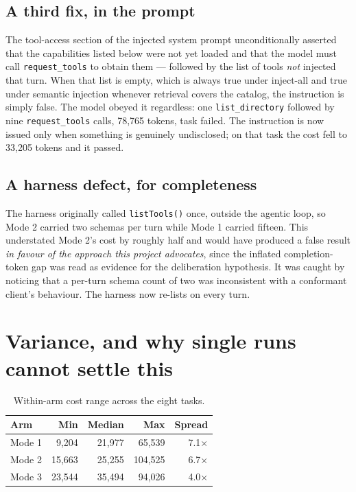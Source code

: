 \documentclass[11pt,a4paper]{article}
\begin{document}
\subsection{A third fix, in the prompt}

The tool-access section of the injected system prompt unconditionally asserted that the capabilities
listed below were not yet loaded and that the model must call \texttt{request\_tools} to obtain them
--- followed by the list of tools \emph{not} injected that turn. When that list is empty, which is
always true under inject-all and true under semantic injection whenever retrieval covers the
catalog, the instruction is simply false. The model obeyed it regardless: one \texttt{list\_directory}
followed by nine \texttt{request\_tools} calls, 78{,}765 tokens, task failed. The instruction is now
issued only when something is genuinely undisclosed; on that task the cost fell to 33{,}205 tokens
and it passed.

\subsection{A harness defect, for completeness}
\label{sec:harnessbug}

The harness originally called \texttt{listTools()} once, outside the agentic loop, so Mode 2 carried
two schemas per turn while Mode 1 carried fifteen. This understated Mode 2's cost by roughly half and
would have produced a false result \emph{in favour of the approach this project advocates}, since the
inflated completion-token gap was read as evidence for the deliberation hypothesis. It was caught by
noticing that a per-turn schema count of two was inconsistent with a conformant client's behaviour.
The harness now re-lists on every turn.

\section{Variance, and why single runs cannot settle this}
\label{sec:variance}

\begin{table}[h]
\centering
\small
\begin{tabular}{@{}lrrrr@{}}
\toprule
\textbf{Arm} & \textbf{Min} & \textbf{Median} & \textbf{Max} & \textbf{Spread} \\
\midrule
Mode 1 &  9,204 & 21,977 &  65,539 & 7.1$\times$ \\
Mode 2 & 15,663 & 25,255 & 104,525 & 6.7$\times$ \\
Mode 3 & 23,544 & 35,494 &  94,026 & 4.0$\times$ \\
\bottomrule
\end{tabular}
\caption{Within-arm cost range across the eight tasks.}
\label{tab:variance}
\end{table}
\end{document}
